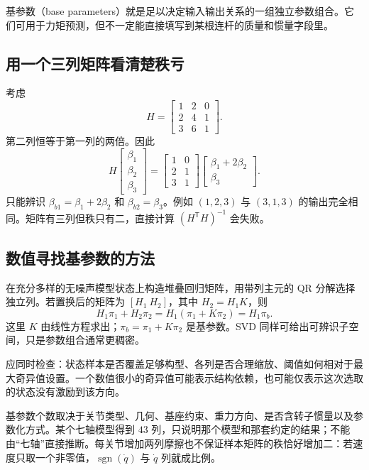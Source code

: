 基参数（base parameters）就是足以决定输入输出关系的一组独立参数组合。它们可用于力矩预测，但不一定能直接填写到某根连杆的质量和惯量字段里。

\subsection{用一个三列矩阵看清楚秩亏}
考虑
\[
 H=\begin{bmatrix}1&2&0\\2&4&1\\3&6&1\end{bmatrix}.
\]
第二列恒等于第一列的两倍。因此
\[
 H\begin{bmatrix}\beta_1\\\beta_2\\\beta_3\end{bmatrix}
 =\begin{bmatrix}1&0\\2&1\\3&1\end{bmatrix}
 \begin{bmatrix}\beta_1+2\beta_2\\\beta_3\end{bmatrix}.
\]
只能辨识 $\beta_{b1}=\beta_1+2\beta_2$ 和 $\beta_{b2}=\beta_3$。例如 $(1,2,3)$ 与 $(3,1,3)$ 的输出完全相同。矩阵有三列但秩只有二，直接计算 $(H^{\mathsf T}H)^{-1}$ 会失败。

\subsection{数值寻找基参数的方法}
在充分多样的无噪声模型状态上构造堆叠回归矩阵，用带列主元的 QR 分解选择独立列。若置换后的矩阵为 $[H_1\ H_2]$，其中 $H_2=H_1K$，则
\[
 H_1\pi_1+H_2\pi_2=H_1(\pi_1+K\pi_2)=H_1\pi_b.
\]
这里 $K$ 由线性方程求出；$\pi_b=\pi_1+K\pi_2$ 是基参数。SVD 同样可给出可辨识子空间，只是参数组合通常更稠密。

应同时检查：状态样本是否覆盖足够构型、各列是否合理缩放、阈值如何相对于最大奇异值设置。一个数值很小的奇异值可能表示结构依赖，也可能仅表示这次选取的状态没有激励到该方向。

\begin{pitfallbox}[七轴不自动等于四十三个惯性基参数]
基参数个数取决于关节类型、几何、基座约束、重力方向、是否含转子惯量以及参数化方式。某个七轴模型得到 $43$ 列，只说明那个模型和那套约定的结果；不能由“七轴”直接推断。每关节增加两列摩擦也不保证样本矩阵的秩恰好增加二：若速度只取一个非零值，$\operatorname{sgn}(\dot q)$ 与 $\dot q$ 列就成比例。
\end{pitfallbox}

